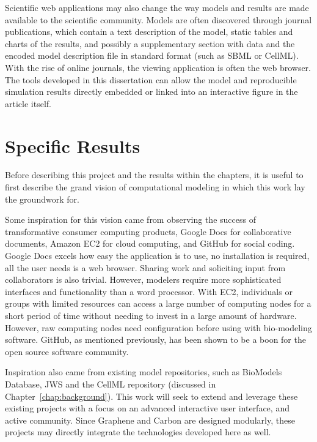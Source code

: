 Scientific web applications may also change the way models and results are made available to the scientific community.
Models are often discovered through journal publications, which contain a text description of the model, static tables and charts of the results, and possibly a supplementary section with data and the encoded model description file in standard format (such as SBML or CellML).
With the rise of online journals, the viewing application is often the web browser.
The tools developed in this dissertation can allow the model and reproducible simulation results directly embedded or linked into an interactive figure in the article itself.

\section{Specific Results}

Before describing this project and the results within the chapters, it is useful to first describe the grand vision of computational modeling in which this work lay the groundwork for.

Some inspiration for this vision came from observing the success of transformative consumer computing products, Google Docs for collaborative documents, Amazon EC2 for cloud computing, and GitHub for social coding.
Google Docs excels how easy the application is to use, no installation is required, all the user needs is a web browser.
Sharing work and soliciting input from collaborators is also trivial.
However, modelers require more sophisticated interfaces and functionality than a word processor.
With EC2, individuals or groups with limited resources can access a large number of computing nodes for a short period of time without needing to invest in a large amount of hardware.
However, raw computing nodes need configuration before using with bio-modeling software.
GitHub, as mentioned previously, has been shown to be a boon for the open source software community.

Inspiration also came from existing model repositories, such as BioModels Database, JWS and the CellML repository (discussed in Chapter~\ref{chap:background}).
This work will seek to extend and leverage these existing projects with a focus on an advanced interactive user interface, and active community.
Since Graphene and Carbon are designed modularly, these projects may directly integrate the technologies developed here as well.


